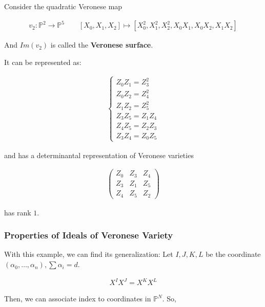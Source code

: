 \documentclass[Total.tex]{subfiles}
\begin{document}
				\begin{example}
					Consider the quadratic Veronese map
					
					\begin{gather*}
						v_2:\mathbb{P}^2\rightarrow \mathbb{P}^5\qquad [X_0,X_1,X_2]\mapsto [X_0^2,X_1^2,X_2^2,X_0X_1,X_0X_2,X_1X_2]
					\end{gather*}
					
					And $Im(v_2)$ is called the \textbf{Veronese surface}.
					
					It can be represented as:
					
					\begin{gather*}
						\begin{cases}
							Z_0Z_1=Z_3^2\\
							Z_0Z_2=Z_4^2\\
							Z_1Z_2=Z_5^2\\
							Z_3Z_5=Z_1Z_4\\
							Z_4Z_5=Z_2Z_3\\
							Z_3Z_4=Z_0Z_5
						\end{cases}
					\end{gather*}
					
					and has a determinantal representation of Veronese varieties
					
					\begin{gather*}
						\begin{pmatrix}
							Z_0&Z_3&Z_4\\
							Z_3&Z_1&Z_5\\
							Z_4&Z_5&Z_2
						\end{pmatrix}
					\end{gather*}
					
					has rank $1$.
				\end{example}
				
				\subsubsection{Properties of Ideals of Veronese Variety}
				
				With this example, we can find its generalization: Let $I,J,K,L$ be the coordinate $(\alpha_0,\dots,\alpha_n),\sum \alpha_i=d$. 
				
				\begin{gather*}
					X^IX^J=X^KX^L
				\end{gather*}
				
				Then, we can associate index to coordinates in $\mathbb{P}^N$. So,
				
\end{document}
